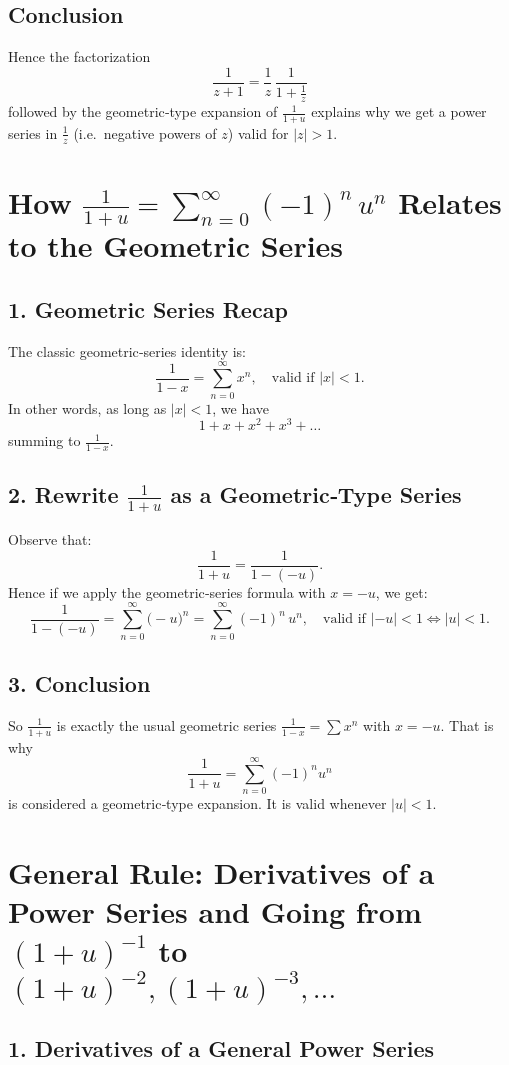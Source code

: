 \documentclass[12pt]{article}
\theoremstyle{definition} %
\theoremstyle{plain} %
\begin{document}
\subsection*{Conclusion}

Hence the factorization 
\[
\frac{1}{z+1}
= \frac{1}{z}\,\frac{1}{1+\frac{1}{z}}
\]
followed by the geometric‐type expansion of \(\tfrac{1}{1+u}\) explains why we get a power series in \(\frac{1}{z}\) (i.e.\ negative powers of \(z\)) valid for \(|z|>1\).
\section*{How \(\displaystyle \frac{1}{1+u} = \sum_{n=0}^\infty (-1)^n\,u^n\) Relates to the Geometric Series}

\subsection*{1. Geometric Series Recap}
The classic geometric‐series identity is:
\[
\frac{1}{1 - x} 
= \sum_{n=0}^\infty x^n,
\quad \text{valid if } |x| < 1.
\]
In other words, as long as \(|x| < 1\), we have 
\[
1 + x + x^2 + x^3 + \dots
\]
summing to \(\tfrac{1}{1-x}\).

\subsection*{2. Rewrite \(\tfrac{1}{1+u}\) as a Geometric‐Type Series}
Observe that:
\[
\frac{1}{1+u}
= \frac{1}{1 - (-u)}.
\]
Hence if we apply the geometric‐series formula with \(x = -u\), we get:
\[
\frac{1}{1 - (-u)} 
= \sum_{n=0}^\infty \bigl(-u\bigr)^n
= \sum_{n=0}^\infty (-1)^n\,u^n,
\quad \text{valid if } |-u|<1 \Leftrightarrow |u|<1.
\]

\subsection*{3. Conclusion}
So \(\displaystyle \frac{1}{1+u}\) is exactly the usual geometric series \(\tfrac{1}{1-x}=\sum x^n\) with \(x=-u\). That is why
\[
\frac{1}{1+u} 
= \sum_{n=0}^\infty (-1)^n u^n
\]
is considered a geometric‐type expansion. It is valid whenever \(\bigl|u\bigr|<1\).
\section*{General Rule: Derivatives of a Power Series and Going from \((1+u)^{-1}\) to \((1+u)^{-2}, (1+u)^{-3},\dots\)}

\subsection*{1. Derivatives of a General Power Series}
\end{document}
